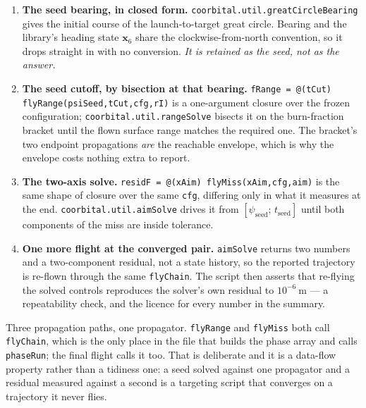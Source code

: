 \documentclass[11pt]{article}
\newcommand{\code}[1]{\texttt{#1}}
\begin{document}
\begin{enumerate}
\item[9a.] \textbf{The seed bearing, in closed form.}
\code{coorbital.util.greatCircleBearing} gives the initial course of the
launch-to-target great circle. Bearing and the library's heading state
$\mathbf{x}_6$ share the clockwise-from-north convention, so it drops straight
in with no conversion. \emph{It is retained as the seed, not as the answer.}

\item[9b.] \textbf{The seed cutoff, by bisection at that bearing.}
\code{fRange = @(tCut) flyRange(psiSeed,tCut,cfg,rI)} is a one-argument closure
over the frozen configuration; \code{coorbital.util.rangeSolve} bisects it on
the burn-fraction bracket until the flown surface range matches the required
one. The bracket's two endpoint propagations \emph{are} the reachable envelope,
which is why the envelope costs nothing extra to report.

\item[9c.] \textbf{The two-axis solve.} \code{residF = @(xAim) flyMiss(xAim,cfg,aim)}
is the same shape of closure over the same \code{cfg}, differing only in what
it measures at the end. \code{coorbital.util.aimSolve} drives it from
$[\psi_{\text{seed}};\,t_{\text{seed}}]$ until both components of the miss are
inside tolerance.

\item[9d.] \textbf{One more flight at the converged pair.} \code{aimSolve}
returns two numbers and a two-component residual, not a state history, so the
reported trajectory is re-flown through the same \code{flyChain}. The script
then asserts that re-flying the solved controls reproduces the solver's own
residual to $10^{-6}~\mathrm{m}$ --- a repeatability check, and the licence for
every number in the summary.
\end{enumerate}

Three propagation paths, one propagator. \code{flyRange} and \code{flyMiss}
both call \code{flyChain}, which is the only place in the file that builds the
phase array and calls \code{phaseRun}; the final flight calls it too. That is
deliberate and it is a data-flow property rather than a tidiness one: a seed
solved against one propagator and a residual measured against a second is a
targeting script that converges on a trajectory it never flies.
\end{document}
